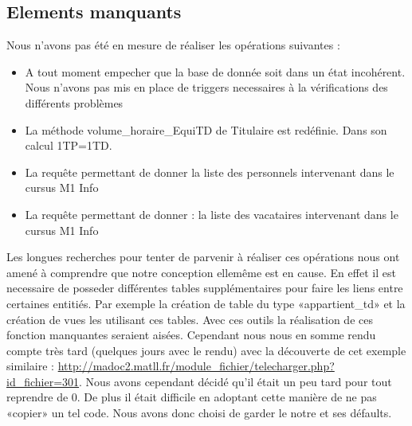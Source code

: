 \clearpage 

\subsection{Elements manquants}
Nous n'avons pas été en mesure de réaliser les opérations suivantes : 
\begin{itemize}
\item
A tout moment empecher que la base de donnée soit dans un état incohérent. Nous n'avons pas mis en place de triggers necessaires à la vérifications des différents problèmes 
\item
La méthode volume\_horaire\_EquiTD de Titulaire est redéfinie. Dans son calcul 1TP=1TD.
\item
La requête permettant de donner la liste des personnels intervenant dans le cursus M1 Info
\item
La requête permettant de donner : la liste des vacataires intervenant dans le cursus M1 Info
\end{itemize}
Les longues recherches pour tenter de parvenir à réaliser ces opérations nous ont amené à comprendre que notre conception ellemême est en cause. En effet il est necessaire de posseder différentes tables supplémentaires pour faire les liens entre certaines entitiés. Par exemple la création de table du type «appartient\_td» et la création de vues les utilisant ces tables. Avec ces outils la réalisation de ces fonction manquantes seraient aisées. Cependant nous nous en somme rendu compte très tard (quelques jours avec le rendu) avec la découverte de cet exemple similaire : \url{http://madoc2.matll.fr/module_fichier/telecharger.php?id_fichier=301}.
 Nous avons cependant  décidé qu'il était un peu tard pour tout reprendre de 0. De plus il était difficile en adoptant cette manière de ne pas «copier» un tel code. Nous avons donc choisi de garder le notre et ses défaults.





